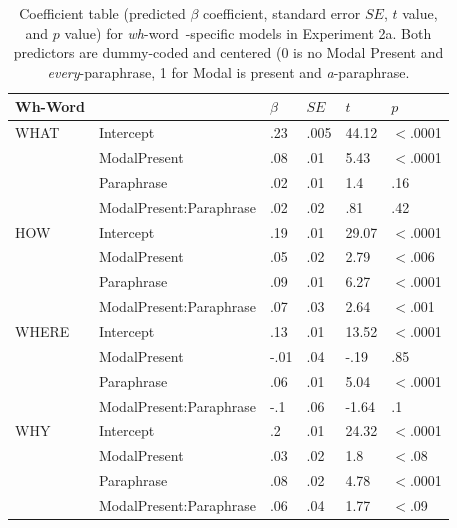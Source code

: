 \documentclass[12pt,letterpaper,table,svgnames,dvipsnames]{article}
\newcommand{\whw}{\emph{wh}-word~}
\begin{document}
\begin{table}
\begin{center} 
\caption{Coefficient table (predicted $\beta$ coefficient, standard error $SE$, $t$ value, and $p$ value) for \whw-specific models in Experiment 2a. Both predictors are dummy-coded and centered (0 is no Modal Present and \emph{every}-paraphrase, 1 for Modal is present and \emph{a}-paraphrase.} 
\label{sub-model_res_ex2a} 
\begin{tabular}{l|lllll} 
\toprule
Wh-Word & {} & $\beta$ & $SE$ & $t$ & $p$\\
\midrule
WHAT & Intercept & .23 & .005 & 44.12 & $<$.0001\\
{} & ModalPresent & .08 & .01 & 5.43 & $<$.0001\\
{} & Paraphrase & .02 & .01 & 1.4 & .16\\
{} & ModalPresent:Paraphrase & .02 & .02 & .81 & .42\\
\midrule
HOW & Intercept & .19 & .01 & 29.07 & $<$.0001\\
{} & ModalPresent & .05 & .02 & 2.79 & $<$.006\\
{} & Paraphrase & .09 & .01 & 6.27 & $<$.0001\\
{} & ModalPresent:Paraphrase & .07 & .03 & 2.64 & $<$.001\\
\midrule
WHERE & Intercept & .13 & .01 & 13.52 & $<$.0001\\
{} & ModalPresent & -.01 & .04 & -.19 & .85\\
{} & Paraphrase & .06 & .01 & 5.04 & $<$.0001\\
{} & ModalPresent:Paraphrase & -.1 & .06 & -1.64 & .1\\
\midrule
WHY & Intercept & .2 & .01 & 24.32 & $<$.0001\\
{} & ModalPresent & .03 & .02 & 1.8 & $<$.08\\
{} & Paraphrase & .08 & .02 & 4.78 & $<$.0001\\
{} & ModalPresent:Paraphrase & .06 & .04 & 1.77 & $<$.09\\

\end{tabular}
\end{center}
\end{table}
\end{document}
